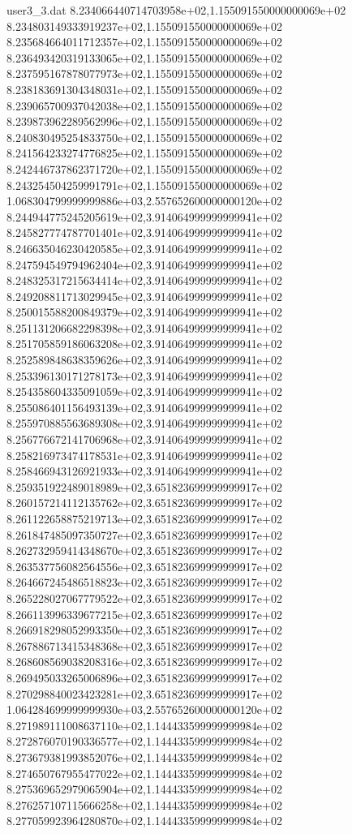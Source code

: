 \begin{filecontents}{user3_3.dat}
8.234066440714703958e+02,1.155091550000000069e+02
8.234803149333919237e+02,1.155091550000000069e+02
8.235684664011712357e+02,1.155091550000000069e+02
8.236493420319133065e+02,1.155091550000000069e+02
8.237595167878077973e+02,1.155091550000000069e+02
8.238183691304348031e+02,1.155091550000000069e+02
8.239065700937042038e+02,1.155091550000000069e+02
8.239873962289562996e+02,1.155091550000000069e+02
8.240830495254833750e+02,1.155091550000000069e+02
8.241564233274776825e+02,1.155091550000000069e+02
8.242446737862371720e+02,1.155091550000000069e+02
8.243254504259991791e+02,1.155091550000000069e+02
1.068304799999999886e+03,2.557652600000000120e+02
8.244944775245205619e+02,3.914064999999999941e+02
8.245827774787701401e+02,3.914064999999999941e+02
8.246635046230420585e+02,3.914064999999999941e+02
8.247594549794962404e+02,3.914064999999999941e+02
8.248325317215634414e+02,3.914064999999999941e+02
8.249208811713029945e+02,3.914064999999999941e+02
8.250015588200849379e+02,3.914064999999999941e+02
8.251131206682298398e+02,3.914064999999999941e+02
8.251705859186063208e+02,3.914064999999999941e+02
8.252589848638359626e+02,3.914064999999999941e+02
8.253396130171278173e+02,3.914064999999999941e+02
8.254358604335091059e+02,3.914064999999999941e+02
8.255086401156493139e+02,3.914064999999999941e+02
8.255970885563689308e+02,3.914064999999999941e+02
8.256776672141706968e+02,3.914064999999999941e+02
8.258216973474178531e+02,3.914064999999999941e+02
8.258466943126921933e+02,3.914064999999999941e+02
8.259351922489018989e+02,3.651823699999999917e+02
8.260157214112135762e+02,3.651823699999999917e+02
8.261122658875219713e+02,3.651823699999999917e+02
8.261847485097350727e+02,3.651823699999999917e+02
8.262732959414348670e+02,3.651823699999999917e+02
8.263537756082564556e+02,3.651823699999999917e+02
8.264667245486518823e+02,3.651823699999999917e+02
8.265228027067779522e+02,3.651823699999999917e+02
8.266113996339677215e+02,3.651823699999999917e+02
8.266918298052993350e+02,3.651823699999999917e+02
8.267886713415348368e+02,3.651823699999999917e+02
8.268608569038208316e+02,3.651823699999999917e+02
8.269495033265006896e+02,3.651823699999999917e+02
8.270298840023423281e+02,3.651823699999999917e+02
1.064284699999999930e+03,2.557652600000000120e+02
8.271989111008637110e+02,1.144433599999999984e+02
8.272876070190336577e+02,1.144433599999999984e+02
8.273679381993852076e+02,1.144433599999999984e+02
8.274650767955477022e+02,1.144433599999999984e+02
8.275369652979065904e+02,1.144433599999999984e+02
8.276257107115666258e+02,1.144433599999999984e+02
8.277059923964280870e+02,1.144433599999999984e+02

\end{filecontents}
